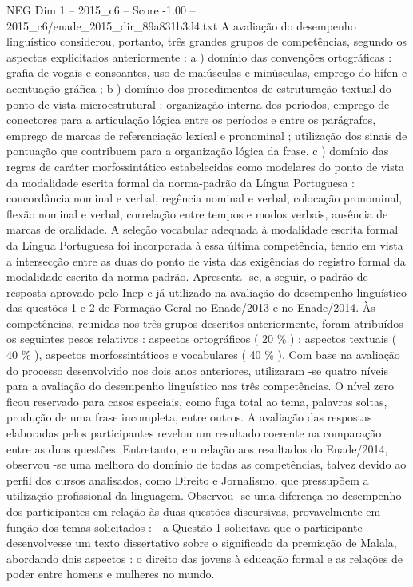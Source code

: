 \begin{textsample}{NEG Dim 1 – 2015\_c6 – Score -1.00 – 2015\_c6/enade\_2015\_dir\_89a831b3d4.txt}
A avaliação do desempenho linguístico considerou, portanto, três grandes grupos de competências, segundo os aspectos explicitados anteriormente : a ) domínio das convenções ortográficas : grafia de vogais e consoantes, uso de maiúsculas e minúsculas, emprego do hífen e acentuação gráfica ; b ) domínio dos procedimentos de estruturação textual do ponto de vista microestrutural : organização interna dos períodos, emprego de conectores para a articulação lógica entre os períodos e entre os parágrafos, emprego de marcas de referenciação lexical e pronominal ; utilização dos sinais de pontuação que contribuem para a organização lógica da frase. c ) domínio das regras de caráter morfossintático estabelecidas como modelares do ponto de vista da modalidade escrita formal da norma-padrão da Língua Portuguesa : concordância nominal e verbal, regência nominal e verbal, colocação pronominal, flexão nominal e verbal, correlação entre tempos e modos verbais, ausência de marcas de oralidade.
A seleção vocabular adequada à modalidade escrita formal da Língua Portuguesa foi incorporada à essa última competência, tendo em vista a intersecção entre as duas do ponto de vista das exigências do registro formal da modalidade escrita da norma-padrão.
Apresenta -se, a seguir, o padrão de resposta aprovado pelo Inep e já utilizado na avaliação do desempenho linguístico das questões 1 e 2 de Formação Geral no Enade/2013 e no Enade/2014.
Às competências, reunidas nos três grupos descritos anteriormente, foram atribuídos os seguintes pesos relativos : aspectos ortográficos ( 20 \% ) ; aspectos textuais ( 40 \% ), aspectos morfossintáticos e vocabulares ( 40 \% ).
Com base na avaliação do processo desenvolvido nos dois anos anteriores, utilizaram -se quatro níveis para a avaliação do desempenho linguístico nas três competências.
O nível zero ficou reservado para casos especiais, como fuga total ao tema, palavras soltas, produção de uma frase incompleta, entre outros.
A avaliação das respostas elaboradas pelos participantes revelou um resultado coerente na comparação entre as duas questões.
Entretanto, em relação aos resultados do Enade/2014, observou -se uma melhora do domínio de todas as competências, talvez devido ao perfil dos cursos analisados, como Direito e Jornalismo, que pressupõem a utilização profissional da linguagem.
Observou -se uma diferença no desempenho dos participantes em relação às duas questões discursivas, provavelmente em função dos temas solicitados : - a Questão 1 solicitava que o participante desenvolvesse um texto dissertativo sobre o significado da premiação de Malala, abordando dois aspectos : o direito das jovens à educação formal e as relações de poder entre homens e mulheres no mundo.

\end{textsample}
